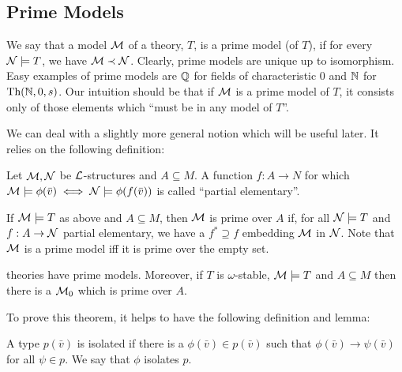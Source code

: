 \subsection{Prime Models}

\begin{definition}\label{definition_prime_model}
We say that a model \(\mathcal{M}\) of a theory, \(T\), is a prime model (of \(T\)), if for every \(\mathcal{N} \models T\), we have \(\mathcal{M} \prec \mathcal{N}\). 
Clearly, prime models are unique up to isomorphism. 
Easy examples of prime models are \(\mathbb{Q}\) for fields of characteristic 0 and \(\mathbb{N}\) for \(\text{Th}(\mathbb{N}, 0, s)\). 
Our intuition should be that if \(\mathcal{M}\) is a prime model of \(T\), it consists only of those elements which ``must be in any model of \(T\)''.
\end{definition}

We can deal with a slightly more general notion which will be useful later. 
It relies on the following definition:

\begin{definition}\label{definition_partial_elementary}
Let \(\mathcal{M}, \mathcal{N}\) be \(\mathcal{L}\)-structures and \(A \subseteq M\).
A function \(f:A \to N\) for which \(\mathcal{M} \models \phi(\bar{v}) \iff \mathcal{N} \models \phi(f(\bar{v}))\) is called ``partial elementary''.
\end{definition}

\begin{definition}\label{definition_prime_over}
If \(\mathcal{M} \models T\) as above and \(A \subseteq M\), then \(\mathcal{M}\) is prime over \(A\) if, for all \(\mathcal{N} \models T\) and \(f:A \to \mathcal{N}\) partial elementary, we have a \(f^* \supseteq f\) embedding \(\mathcal{M}\) in \(\mathcal{N}\). 
Note that \(\mathcal{M}\) is a prime model iff it is prime over the empty set.
\end{definition}

\begin{theorem}\label{thm_omst_prime}
\omst theories have prime models. Moreover, if \(T\) is \(\omega\)-stable, \(\mathcal{M} \models T\) and \(A \subseteq M\) then there is a \(\mathcal{M}_0\) which is prime over \(A\). 
\end{theorem}

\noindent To prove this theorem, it helps to have the following definition and lemma:
\begin{definition}\label{definition_isolated_types}
A type \(p(\bar{v})\) is isolated if there is a \(\phi(\bar{v}) \in p(\bar{v})\) such that \(\phi(\bar{v}) \to \psi(\bar{v})\) for all \(\psi \in p\). We say that \(\phi\) isolates \(p\). %
\end{definition}

